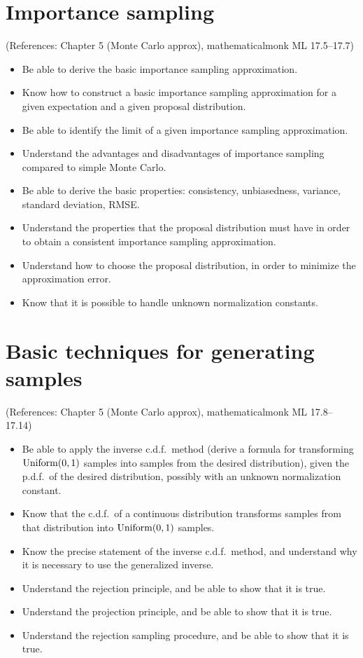 \documentclass[12pt]{article}
\begin{document}
\section{Importance sampling}
(References: Chapter 5 (Monte Carlo approx), mathematicalmonk ML 17.5--17.7)
\begin{itemize}
\setlength\itemsep{0em}
\item Be able to derive the basic importance sampling approximation.
\item Know how to construct a basic importance sampling approximation for a given expectation and a given proposal distribution.
\item Be able to identify the limit of a given importance sampling approximation.
\item Understand the advantages and disadvantages of importance sampling compared to simple Monte Carlo.
\item Be able to derive the basic properties: consistency, unbiasedness, variance, standard deviation, RMSE.
\item Understand the properties that the proposal distribution must have in order to obtain a consistent importance sampling approximation.
\item Understand how to choose the proposal distribution, in order to minimize the approximation error.
\item Know that it is possible to handle unknown normalization constants.
\end{itemize}




\section{Basic techniques for generating samples}
(References: Chapter 5 (Monte Carlo approx), mathematicalmonk ML 17.8--17.14)
\begin{itemize}
\setlength\itemsep{0em}
\item Be able to apply the inverse c.d.f.\ method (derive a formula for transforming $\operatorname*{Uniform}(0,1)$ samples into samples from the desired distribution), given the p.d.f.\ of the desired distribution, possibly with an unknown normalization constant.
\item Know that the c.d.f.\ of a continuous distribution transforms samples from that distribution into $\operatorname*{Uniform}(0,1)$ samples.
\item Know the precise statement of the inverse c.d.f.\ method, and understand why it is necessary to use the generalized inverse.
\item Understand the rejection principle, and be able to show that it is true.
\item Understand the projection principle, and be able to show that it is true.
\item Understand the rejection sampling procedure, and be able to show that it is true.
\end{itemize}
\end{document}
